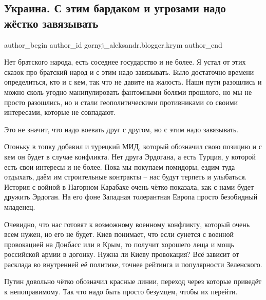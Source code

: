  
 
 
 
 
\subsection{Украина. С этим бардаком и угрозами надо жёстко завязывать}
\label{sec:24_12_2021.stz.news.ru.eho_moskvy.1.ukraina_ugrozy_bardak}

\ifcmt
 author_begin
   author_id gornyj_aleksandr.blogger.krym
 author_end
\fi

Нет братского народа, есть соседнее государство и не более. Я устал от этих
сказок про братский народ и с этим надо завязывать. Было достаточно времени
определиться, кто и с кем, так что не давите на жалость. Наши пути разошлись и
можно сколь угодно манипулировать фантомными болями прошлого, но мы не просто
разошлись, но и стали геополитическими противниками со своими интересами,
которые не совпадают. 

Это не значит, что надо воевать друг с другом, но с этим надо завязывать. 

Огоньку в топку добавил и турецкий МИД, который обозначил свою позицию и с кем
он будет в случае конфликта. Нет друга Эрдогана, а есть Турция, у которой есть
свои интересы и не более. Пока мы покупаем помидоры, ездим туда отдыхать, даём
им строительные контракты – нас будут терпеть и улыбаться. История с войной в
Нагорном Карабахе очень чётко показала, как с нами будет дружить Эрдоган. На
его фоне Западная толерантная Европа просто безобидный младенец. 

Очевидно, что нас готовят к возможному военному конфликту, который очень всем
нужен, но его не будет. Киев понимает, что если сунется с военной провокацией
на Донбасс или в Крым, то получит хорошего леща и мощь российской армии в
догонку. Нужна ли Киеву провокация? Всё зависит от расклада во внутренней её
политике, точнее рейтинга и популярности Зеленского. 

Путин довольно чётко обозначил красные линии, переход через которые приведёт к
непоправимому. Так что надо быть просто безумцем, чтобы их перейти.

